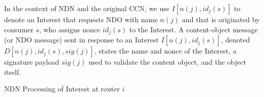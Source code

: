 \documentclass{ancs15-alternate}
\begin{document}
In the context of NDN and the original CCN, we use $I[n(j), id_j(s) ]$ to denote  an Interest that requests NDO with name $n(j)$  and that is originated by consumer $s$, who  assigns nonce $id_j(s)$ to the Interest.  A content-object message (or NDO message) sent in response to an Interest $I[n(j), id_j(s) ]$, denoted $D[n(j), id_j(s), sig(j) ]$, states the name and nonce of the Interest, a signature payload $sig(j)$ used to validate the content object, and the object itself. 
 
\begin{algorithm}[h]
\caption{NDN Processing of Interest at router $i$}
\label{algo-ndn-Interest}
{\fontsize{8}{8}\selectfont
\begin{algorithmic}[1]
\ELSE
	\ELSE 
		\ELSE
		\ENDIF
		\ENDIF

	\ENDIF
\ENDIF
\end{algorithmic}}
\end{algorithm}
\end{document}
